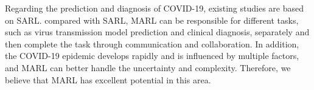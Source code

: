 \documentclass[acmsmall]{acmart}
\begin{document}
Regarding the prediction and diagnosis of COVID-19, existing studies are based on SARL. compared with SARL, MARL can be responsible for different tasks, such as virus transmission model prediction and clinical diagnosis, separately and then complete the task through communication and collaboration. In addition, the COVID-19 epidemic develops rapidly and is influenced by multiple factors, and MARL can better handle the uncertainty and complexity. Therefore, we believe that MARL has excellent potential in this area.
\end{document}
